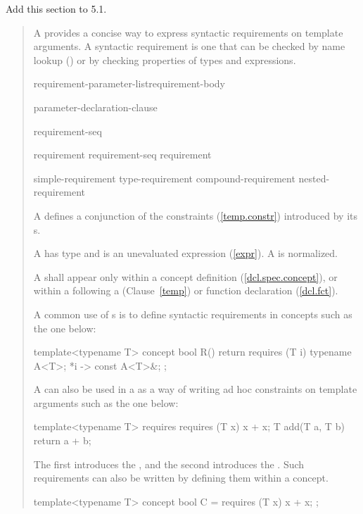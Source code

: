 Add this section to 5.1.

\begin{quote}

\pnum
A  provides a concise way to express 
syntactic requirements on template arguments.
A syntactic requirement is one that can be checked by name lookup 
() or by checking properties of types and expressions.

\begin{bnf}
\br
     requirement-parameter-list\opt requirement-body

\br
    \terminal{(} parameter-declaration-clause\opt \terminal{)}
  
\br
    \terminal{\{} requirement-seq \terminal{\}}

\br
    requirement\br
    requirement-seq requirement

\br
    simple-requirement\br
    type-requirement\br
    compound-requirement\br
    nested-requirement
\end{bnf}

\pnum
A  defines a conjunction of the constraints 
(\ref{temp.constr}) introduced by its s.

\pnum
A  has type  and is an 
unevaluated expression (\ref{expr}).
\enternote
A  is normalized.
\exitnote

\pnum
A  shall appear
only within a concept definition (\ref{dcl.spec.concept}),
or within a  following a
(Clause~\ref{temp}) or function declaration (\ref{dcl.fct}).

\enterexample
A common use of s is to define
syntactic requirements in concepts such as the one below:
\begin{codeblock}
template<typename T>
  concept bool R() {
    return requires (T i) {
      typename A<T>;
      {*i} -> const A<T>&;
    };
  }
\end{codeblock}
A  can also be used in a 
 as a way of writing ad hoc 
constraints on template arguments such as the one below:
\begin{codeblock}
template<typename T>
  requires requires (T x) { x + x; }
    T add(T a, T b) { return a + b; }
\end{codeblock}
The first  introduces the 
, and the second
introduces the .
\exitexample
\enternote
Such requirements can also be written by defining them within
a concept.
\begin{codeblock}
template<typename T>
  concept bool C = requires (T x) { x + x; };


\end{codeblock}
\end{quote}
